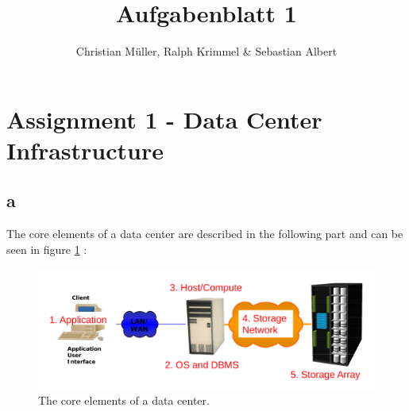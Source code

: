 \documentclass{article}
\begin{document}
\title{Aufgabenblatt 1}
\author{Christian Müller, Ralph Krimmel \& Sebastian Albert }

\maketitle


\section*{Assignment 1 - Data Center Infrastructure}

\subsection*{a}
	The core elements of a data center are described in the following part and can be seen in figure \ref{fig:coredata} :

	\begin{figure}[t]
		\begin{center}
			\includegraphics[width=\textwidth]{pic/datacenter.png}
		\end{center}
		\caption{The core elements of a data center.}
		\label{fig:coredata}
	\end{figure}
\end{document}
